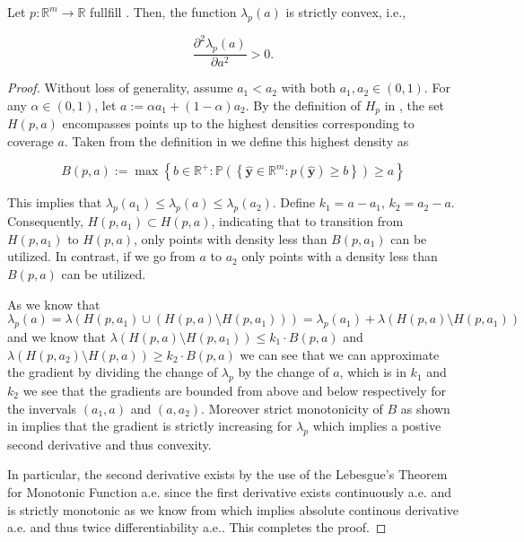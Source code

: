 \begin{lemma}
    Let \(p: \mathbb{R}^m \to \mathbb{R}\) fullfill . Then, the function $\lambda_{p}(a)$ is strictly convex, i.e.,

    \begin{equation}
        \frac{\partial^2 \lambda_{p}(a)}{\partial a^2} > 0.
    \end{equation}

\end{lemma}
\begin{proof}
    Without loss of generality, assume \(a_1 < a_2\) with both \(a_1, a_2 \in (0,1)\). For any \(\alpha \in (0, 1)\), let \(a := \alpha a_1 + (1-\alpha) a_2\). By the definition of \(H_p\) in , the set \(H(p, a)\) encompasses points up to the highest densities corresponding to coverage \(a\). Taken from the definition in  we define this highest density as

    \begin{equation}
        B(p, a):=\max \left\{b \in \mathbb{R^+}: \mathbb{P}\left(\left\{\mathbf{\hat{y}}
        \in
        \mathbb{R}^m: p(\mathbf{\hat{y}}) \geq b\right\}\right) \geq a
        \right\}
    \end{equation}

    This implies that \(\lambda_{p}(a_1) \leq \lambda_{p}(a) \leq \lambda_{p}(a_2)\). Define $k_1 = a-a_1$, $k_2 = a_2 - a$. Consequently, \(H(p, a_1) \subset H(p, a)\), indicating that to transition from \(H(p, a_1)\) to \(H(p, a)\), only points with density less than $B(p, a_1)$ can be utilized. In contrast, if we go from $a$ to $a_2$ only points with a density less than $B(p, a)$ can be utilized.

    As we know that
    \begin{equation}
        \lambda_p(a) = \lambda(H(p, a_1) \cup (H(p,a)\setminus H(p,a_1))) = \lambda_p(a_1) + \lambda(H(p,a)\setminus H(p, a_1))
    \end{equation}
    and we know that $\lambda(H(p,a)\setminus H(p, a_1)) \leq k_1 \cdot B(p, a)$ and $\lambda(H(p,a_2)\setminus H(p, a)) \geq k_2 \cdot B(p, a)$ we can see that we can approximate the gradient by dividing the change of $\lambda_p$ by the change of $a$, which is in $k_1$ and $k_2$ we see that the gradients are bounded from above and below respectively for the invervals $(a_1, a)$ and $(a, a_2)$. Moreover strict monotonicity of $B$ as shown in  implies that the gradient is strictly increasing for $\lambda_p$ which implies a postive second derivative and thus convexity.

    In particular, the second derivative exists by the use of the Lebesgue's Theorem for Monotonic Function a.e. since the first derivative exists continuously a.e. and is strictly monotonic as we know from  which implies absolute continous derivative a.e. and thus twice differentiability a.e.. This completes the proof.
\end{proof}


